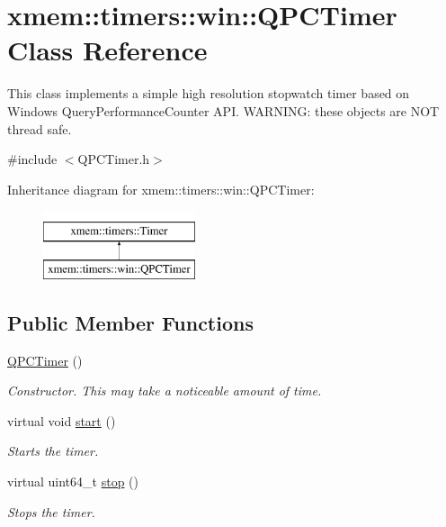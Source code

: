 \hypertarget{classxmem_1_1timers_1_1win_1_1_q_p_c_timer}{}\section{xmem\+:\+:timers\+:\+:win\+:\+:Q\+P\+C\+Timer Class Reference}
\label{classxmem_1_1timers_1_1win_1_1_q_p_c_timer}


This class implements a simple high resolution stopwatch timer based on Windows\textquotesingle{} Query\+Performance\+Counter A\+P\+I. W\+A\+R\+N\+I\+N\+G\+: these objects are N\+O\+T thread safe.  




{\ttfamily \#include $<$Q\+P\+C\+Timer.\+h$>$}

Inheritance diagram for xmem\+:\+:timers\+:\+:win\+:\+:Q\+P\+C\+Timer\+:\begin{figure}[H]
\begin{center}
\leavevmode
\includegraphics[height=2.000000cm]{classxmem_1_1timers_1_1win_1_1_q_p_c_timer}
\end{center}
\end{figure}
\subsection*{Public Member Functions}
\begin{DoxyCompactItemize}
\item 
\hypertarget{classxmem_1_1timers_1_1win_1_1_q_p_c_timer_a4f05ac32e4c2fd981e84646de2de526e}{}\hyperlink{classxmem_1_1timers_1_1win_1_1_q_p_c_timer_a4f05ac32e4c2fd981e84646de2de526e}{Q\+P\+C\+Timer} ()\label{classxmem_1_1timers_1_1win_1_1_q_p_c_timer_a4f05ac32e4c2fd981e84646de2de526e}

\begin{DoxyCompactList}\small\item\em Constructor. This may take a noticeable amount of time. \end{DoxyCompactList}\item 
\hypertarget{classxmem_1_1timers_1_1win_1_1_q_p_c_timer_a22e88913a13a0d543d18ffcaec7c0466}{}virtual void \hyperlink{classxmem_1_1timers_1_1win_1_1_q_p_c_timer_a22e88913a13a0d543d18ffcaec7c0466}{start} ()\label{classxmem_1_1timers_1_1win_1_1_q_p_c_timer_a22e88913a13a0d543d18ffcaec7c0466}

\begin{DoxyCompactList}\small\item\em Starts the timer. \end{DoxyCompactList}\item 
virtual uint64\+\_\+t \hyperlink{classxmem_1_1timers_1_1win_1_1_q_p_c_timer_a22ef37cd945c7e57345e1ce83340884a}{stop} ()
\begin{DoxyCompactList}\small\item\em Stops the timer. \end{DoxyCompactList}\end{DoxyCompactItemize}
